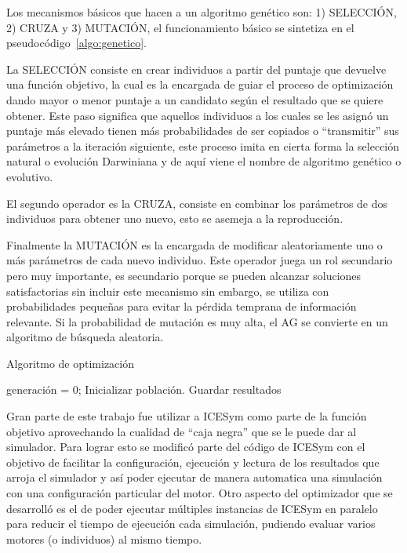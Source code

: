 %
Los mecanismos básicos que hacen a un algoritmo genético son: 1) SELECCIÓN,
2) CRUZA y 3) MUTACIÓN, el funcionamiento básico se sintetiza en el
pseudocódigo~\ref{algo:genetico}.

La SELECCIÓN consiste en crear individuos a partir del puntaje que devuelve
una función objetivo, la cual es la encargada de guiar el proceso de
optimización dando mayor o menor puntaje a un candidato según el resultado que
se quiere obtener.
%
Este paso significa que aquellos individuos a los cuales se les asignó un
puntaje más elevado tienen más probabilidades de ser copiados o ``transmitir''
sus parámetros a la iteración siguiente, este proceso imita en cierta forma la
selección natural o evolución Darwiniana y de aquí viene el nombre de algoritmo
genético o evolutivo.

El segundo operador es la CRUZA, consiste en combinar los parámetros de dos
individuos para obtener uno nuevo, esto se asemeja a la reproducción.

Finalmente la MUTACIÓN es la encargada de modificar aleatoriamente uno o más
parámetros de cada nuevo individuo.
%
Este operador juega un rol secundario pero muy importante, es secundario porque
se pueden alcanzar soluciones satisfactorias sin incluir este mecanismo sin
embargo, se utiliza con probabilidades pequeñas para evitar la pérdida temprana
de información relevante.
%
Si la probabilidad de mutación es muy alta, el AG se convierte en un algoritmo
de búsqueda aleatoria.


\begin{algorithm} \caption{Algoritmo de optimización}\label{algo:genetico}
  generación = 0;
  Inicializar población.\;
  {Guardar resultados\;}
\end{algorithm}

%
%
Gran parte de este trabajo fue utilizar a ICESym como parte de la función
objetivo aprovechando la cualidad de ``caja negra'' que se le puede dar al
simulador.
%
Para lograr esto se modificó parte del código de ICESym con el objetivo de
facilitar la configuración, ejecución y lectura de los resultados que arroja el
simulador y así poder ejecutar de manera automatica una simulación con una
configuración particular del motor.
%
Otro aspecto del optimizador que se desarrolló es el de poder ejecutar múltiples
instancias de ICESym en paralelo para reducir el tiempo de ejecución cada
simulación, pudiendo evaluar varios motores (o individuos) al mismo tiempo.

